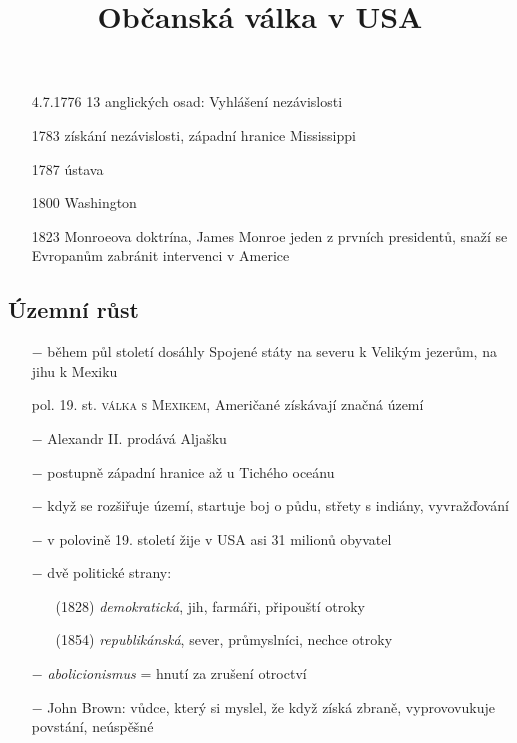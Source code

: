 \documentclass{article}
\title{\vspace{-2cm}Občanská válka v USA\vspace{-1.7cm}}
\date{}
\author{}
\begin{document}
\maketitle
\begin{itemize}
    \vspace{-0.5em}
    \setlength\itemsep{0.15em}
    \item[4.7.1776] 13 anglických osad: Vyhlášení nezávislosti
    \item[1783] získání nezávislosti, západní hranice Mississippi
    \item[1787] ústava
    \item[1800] Washington
    \item[1823] Monroeova doktrína, James Monroe jeden z prvních presidentů, snaží se Evropanům zabránit intervenci v Americe
\end{itemize}

\subsection*{Územní růst}
\begin{itemize}
    \vspace{-0.5em}
    \setlength\itemsep{0.15em}
    \item[$-$] během půl století dosáhly Spojené státy na severu k Velikým jezerům, na jihu k Mexiku
    \item[pol. 19. st.] \textsc{válka s Mexikem}, Američané získávají značná území
    \item[$-$] Alexandr II. prodává Aljašku
    \item[$-$] postupně západní hranice až u Tichého oceánu
    \item[$-$] když se rozšiřuje území, startuje boj o půdu, střety s indiány, vyvražďování
    \item[$-$] v polovině 19. století žije v USA asi 31 milionů obyvatel
    \item[$-$] dvě politické strany:
    \begin{itemize}
        \vspace{-0.5em}
        \setlength\itemsep{0.15em}
        \item[(1828)] \textit{demokratická}, jih, farmáři, připouští otroky
        \item[(1854)] \textit{republikánská}, sever, průmyslníci, nechce otroky
    \end{itemize}
    \item[$-$] \textit{abolicionismus} = hnutí za zrušení otroctví
    \item[$-$] John Brown: vůdce, který si myslel, že když získá zbraně, vyprovovukuje povstání, neúspěšné
\end{itemize}
\end{document}
